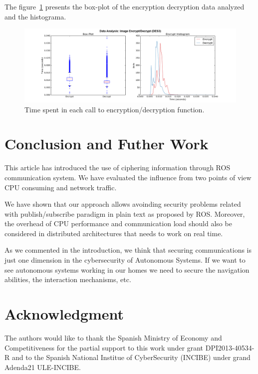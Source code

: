 \documentclass[journal,twoside]{JoPhA}
\begin{document}
The figure~\ref{fig:images_encryption} presents the box-plot of the encryption decryption data analyzed and the histograma. 

\begin{figure}[ht]
    \centering
    \includegraphics[width=.9\textwidth]{Outline_images_encryption_decrytiontime2.png}
    \caption{Time spent in each call to encryption/decryption function.}
  \label{fig:images_encryption}
\end{figure}

\section{Conclusion and Futher Work}

This article has introduced the use of ciphering information through ROS communication system.
We have evaluated the influence from two points of view CPU consuming and network traffic. 

We have shown that our approach allows avoinding security problems related with publish/subscribe paradigm in plain text as proposed by ROS.
Moreover, the overhead of CPU performance and communication load should also be considered in distributed architectures that needs to work on real time.


As we commented in the introduction, we think that securing communications is just one dimension in  the cybersecurity of Autonomous Systems. If we want to see autonomous systems working in our homes we need to secure the navigation abilities, the interaction mechanisms, etc. 


\section*{Acknowledgment}
The authors would  like to thank the Spanish Ministry of Economy and Competitiveness for the partial support to this work under grant DPI2013-40534-R and to the Spanish National Institue of CyberSecurity (INCIBE) under grand Adenda21 ULE-INCIBE.

 

\end{document}
